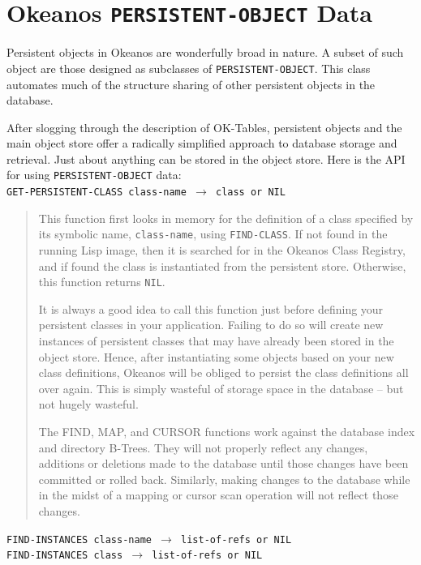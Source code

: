 \documentclass[article,oneside]{memoir}
\begin{document}
\chapter{Okeanos \texttt{PERSISTENT-OBJECT} Data}
Persistent objects in Okeanos are wonderfully broad in nature. A subset of such object are those designed as subclasses of \texttt{PERSISTENT-OBJECT}. This class automates much of the structure sharing of other persistent objects in the database. 

After slogging through the description of OK-Tables, persistent objects and the main object store offer a radically simplified approach to database storage and retrieval. Just about anything can be stored in the object store. Here is the API for using \texttt{PERSISTENT-OBJECT} data:
\\

\noindent \texttt{GET-PERSISTENT-CLASS class-name $\rightarrow$ class or NIL}

\begin{quote}
This function first looks in memory for the definition of a class specified by its symbolic name, \texttt{class-name}, using \texttt{FIND-CLASS}. If not found in the running Lisp image, then it is searched for in the Okeanos Class Registry, and if found the class is instantiated from the persistent store. Otherwise, this function returns \texttt{NIL}. 

It is always a good idea to call this function just before defining your persistent classes in your application. Failing to do so will create new instances of persistent classes that may have already been stored in the object store. Hence, after instantiating some objects based on your new class definitions, Okeanos will be obliged to persist the class definitions all over again. This is simply wasteful of storage space in the database -- but not hugely wasteful.

The FIND, MAP, and CURSOR functions work against the database index and directory B-Trees. They will not properly reflect any changes, additions or deletions made to the database until those changes have been committed or rolled back. Similarly, making changes to the database while in the midst of a mapping or cursor scan operation will not reflect those changes.
\end{quote}

\noindent
\texttt{FIND-INSTANCES class-name $\rightarrow$ list-of-refs or NIL} \\ \noindent
\texttt{FIND-INSTANCES class $\rightarrow$ list-of-refs or NIL}
\end{document}
